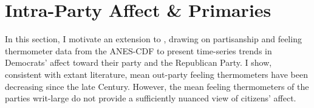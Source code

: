 \documentclass[12pt]{article}
\begin{document}




\section{Intra-Party Affect \& Primaries}

In this section, I motivate an extension to \citet{iyengar2012affect}, drawing on partisanship and feeling thermometer data from the ANES-CDF to present time-series trends in Democrats' affect toward their party and the Republican Party. I show, consistent with extant literature, mean out-party feeling thermometers have been decreasing since the late  Century. However, the mean feeling thermometers of the parties writ-large do not provide a sufficiently nuanced view of citizens' affect.
\end{document}

